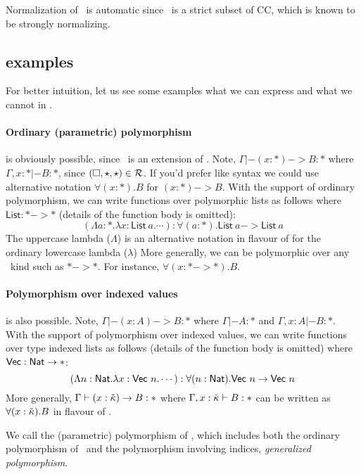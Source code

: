 Normalization of \Fi\ is automatic since \Fi\ is a strict subset of CC,
which is known to be strongly normalizing.

\subsection{examples}
For better intuition, let us see some examples what we can express and
what we cannot in \Fi.
\newcommand{\List}{\mathsf{List}}
\newcommand{\Vect}{\mathsf{Vec}}

\paragraph{Ordinary (parametric) polymorphism} is obviously possible,
since \Fi\ is an extension of \Fw. Note, $\Gamma |- (x:*) -> B : *$
where $\Gamma,x:* |- B:*$, since $(\square,\star,\star) \in\mathcal{R}$.
If you'd prefer \Fw\-like syntax we could use alternative notation
$\forall(x:*).B$ for $(x:*) -> B$. With the support of ordinary polymorphism,
we can write functions over polymorphic lists as follows
where $\List : * -> *$ (details of the function body is omitted):
\[ (\Lambda a:*.\lambda x:\List~a. \cdots) : \forall(a:*).\List~a -> \List~a \]
The uppercase lambda ($\Lambda$) is an alternative notation in flavour of \Fw
for the ordinary lowercase lambda ($\lambda$)
More generally, we can be polymorphic over any \Fw\ kind such as $* -> *$.
For instance, $\forall(x:* -> *).B$.

\paragraph{Polymorphism over indexed values} is also possible.
Note, $\Gamma |- (x:A) -> B : *$ where $\Gamma |- A:*$ and $\Gamma,x:A |- B:*$.
With the support of polymorphism over indexed values, we can write functions
over type indexed lists as follows (details of the function body is omitted)
where $\Vect : \Nat -> *$:
\[
(\Lambda n:\Nat.\lambda x:\Vect~n. \cdots) : \forall(n:\Nat).\Vect~n -> \Vect~n 
\]
More generally, $\Gamma |- (x:{\check\kappa}) -> B : *$ where $\Gamma, x:{\check\kappa} |- B:*$
can be written as $\forall(x:{\check\kappa}).B$ in flavour of \Fw.

We call the (parametric) polymorphism of \Fi, which includes
both the ordinary polymorphism of \Fw\ and the polymorphism involving indices,
\emph{generalized polymorphism}.

